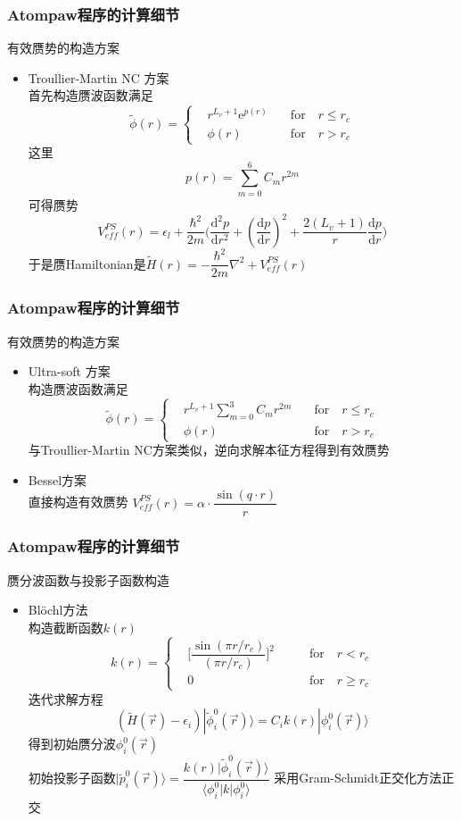\documentclass[cjk,slidestop,compress,mathserif,blue]{beamer}
\begin{document}
\frame
{
	\frametitle{\textrm{Atompaw}程序的计算细节}
	有效赝势的构造方案
	\begin{itemize}
		\item \textrm{Troullier-Martin NC} 方案 \\
	首先构造赝波函数满足
	\begin{displaymath}
		\tilde\phi(r)=\left\{
			\begin{aligned}
				&r^{L_v+1}\mathrm{e}^{p(r)}\quad &\mathrm{for}\quad r\leqslant r_c \\
				&\phi(r)\quad &\mathrm{for}\quad r>r_c
			\end{aligned}
			\right.
	\end{displaymath}
	这里$$p(r)=\sum_{m=0}^6C_mr^{2m}$$
	可得赝势 
	$$V_{eff}^{PS}(r)=\epsilon_l+\dfrac{\hbar^2}{2m}\bigg(\dfrac{\mathrm{d}^2p}{\mathrm{d}r^2}+(\dfrac{\mathrm{d}p}{\mathrm{d}r})^2+\dfrac{2(L_v+1)}r\dfrac{\mathrm{d}p}{\mathrm{d}r}\bigg)$$
	于是赝\textrm{Hamiltonian}是$\tilde H(r)=-\dfrac{\hbar^2}{2m}\nabla^2+V_{eff}^{PS}(r)$
	\end{itemize}
}
\frame
{
	\frametitle{\textrm{Atompaw}程序的计算细节}
	有效赝势的构造方案
	\begin{itemize}
		\item \textrm{Ultra-soft} 方案 \\
	构造赝波函数满足
	\begin{displaymath}
		\tilde\phi(r)=\left\{
			\begin{aligned}
				&r^{L_v+1}\sum_{m=0}^3C_mr^{2m}\quad &\mathrm{for}\quad r\leqslant r_c \\
				&\phi(r)\quad &\mathrm{for}\quad r>r_c
			\end{aligned}
			\right.
	\end{displaymath}
	与\textrm{Troullier-Martin NC}方案类似，逆向求解本征方程得到有效赝势
		\item \textrm{Bessel}方案\\
			直接构造有效赝势 $V_{eff}^{PS}(r)=\alpha\cdot\dfrac{\sin(q\cdot r)}r$
	\end{itemize}
}

\frame
{
	\frametitle{\textrm{Atompaw}程序的计算细节}
	赝分波函数与投影子函数构造
	\begin{itemize}
		\item \textrm{Bl\"ochl}方法\\
			构造截断函数$k(r)$
	\begin{displaymath}
		k(r)=\left\{
			\begin{aligned}
				&\bigg[\dfrac{\sin({\pi r/r_c})}{(\pi r/r_c)}\bigg]^2\qquad &\mathrm{for}\quad r<r_c \\
				&0\qquad &\mathrm{for}\quad r\geqslant r_c
			\end{aligned}
			\right.
	\end{displaymath}
	迭代求解方程
	$$(\tilde H(\vec r)-\epsilon_i)|\tilde\phi_i^0(\vec r)\rangle=C_ik(r)|\phi_i^0(\vec r)\rangle$$
	得到初始赝分波$\phi_i^0(\vec r)$\\
	初始投影子函数$|\tilde p_i^0(\vec r)\rangle=\dfrac{k(r)|\tilde\phi_i^0(\vec r)\rangle}{\langle\phi_i^0|k|\phi_i^0\rangle}$
	采用\textrm{Gram-Schmidt}正交化方法正交
	\end{itemize}
}
\end{document}
